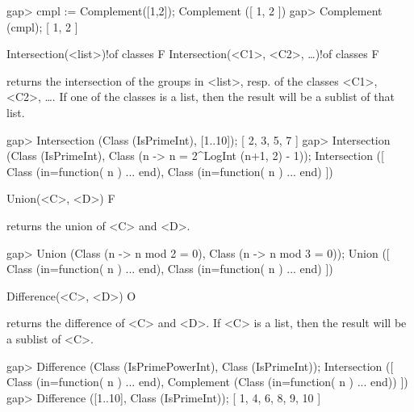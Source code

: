 \beginexample
gap> cmpl := Complement([1,2]);
Complement ([ 1, 2 ])
gap> Complement (cmpl);
[ 1, 2 ]
\endexample

\>Intersection(<list>)!{of classes} F
\>Intersection(<C1>, <C2>, \dots)!{of classes} F

returns the intersection of the groups in <list>, resp. of the classes
<C1>, <C2>, \dots. If one of the classes is a list, then the result will be
a sublist of that list.

\beginexample
gap> Intersection (Class (IsPrimeInt), [1..10]);
[ 2, 3, 5, 7 ]
gap> Intersection (Class (IsPrimeInt), Class (n -> n = 2^LogInt (n+1, 2) - 1));
Intersection ([ Class (in=function( n ) ... end), 
  Class (in=function( n ) ... end) ])
\endexample

\>Union(<C>, <D>) F

returns the union of <C> and <D>.  

\beginexample
gap> Union (Class (n -> n mod 2 = 0), Class (n -> n mod 3 = 0));
Union ([ Class (in=function( n ) ... end), Class (in=function( n ) ... end) ])
\endexample

\>Difference(<C>, <D>) O

returns the difference of <C> and <D>. If <C> is a list, then the
result will be a sublist of <C>.

\beginexample
gap> Difference (Class (IsPrimePowerInt), Class (IsPrimeInt));
Intersection ([ Class (in=function( n ) ... end), 
  Complement (Class (in=function( n ) ... end)) ])
gap> Difference ([1..10], Class (IsPrimeInt));
[ 1, 4, 6, 8, 9, 10 ]
\endexample


